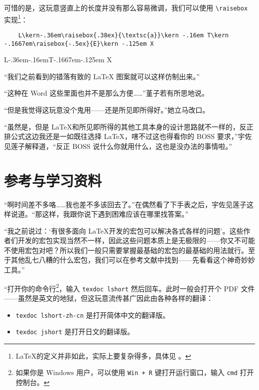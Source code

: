 可惜的是，这玩意竖直上的长度并没有那么容易微调，我们可以使用 \verb"\raisebox" 实现\footnote{\LaTeX 的定义并非如此，实际上要复杂得多，具体见  \textcite[The \LaTeXe{} Sources]{braams2003latex2varepsilon} 。}：


\begin{lstlisting}
    L\kern-.36em\raisebox{.38ex}{\textsc{a}}\kern -.16em T\kern -.1667em\raisebox{-.5ex}{E}\kern -.125em X
\end{lstlisting}



\begin{center}
    L\kern-.36em\kern-.16emT\kern -.1667em\raisebox{-.5ex}{E}\kern -.125em X
\end{center}


“我们之前看到的错落有致的 \LaTeX{} 图案就可以这样仿制出来。”

“这种在 Word 这些里面也并不是那么方便……”堇子若有所思地说。

“但是我觉得这玩意没个鬼用——还是所见即所得好。”她立马改口。

“虽然是，但是 \LaTeX 和所见即所得的其他工具本身的设计思路就不一样的，反正排公式这边我还是一如既往选择 \LaTeX，嗐不过这也得看你的 BOSS 要求，”宇佐见莲子解释道，“反正 BOSS 说什么你就用什么，这也是没办法的事情啦。”

\section{参考与学习资料}

“啊时间差不多咯……我也差不多该回去了。”在偶然看了下手表之后，宇佐见莲子这样说道。“那这样，我跟你说下遇到困难应该在哪里找答案。”

“我之前说过：‘有很多面向 \LaTeX 开发的宏包可以解决各式各样的问题’。这些作者们开发的宏包实现当然不一样，因此这些问题本质上是无极限的——你又不可能不使用宏包对吧？所以我们一般只需要掌握最基础的宏包的最基础的用法就行。至于其他乱七八糟的什么宏包，我们可以在参考文献中找到——先看看这个神奇妙妙工具。”

“打开你的命令行\footnote{如果你是 Windows 用户，可以使用 \texttt{Win + R} 键打开运行窗口，输入 \texttt{cmd} 打开控制台。}，输入 \verb"texdoc lshort" 然后回车。此时一般会打开个 PDF 文件 \textcite[LShort]{oetiker2003not}
——虽然是英文的地狱，但这玩意流传甚广因此由各种各样的翻译：

\begin{itemize}
    \item  \verb"texdoc lshort-zh-cn" 是打开简体中文的翻译版。
    \item  \verb"texdoc jshort" 是打开日文的翻译版。
\end{itemize}

